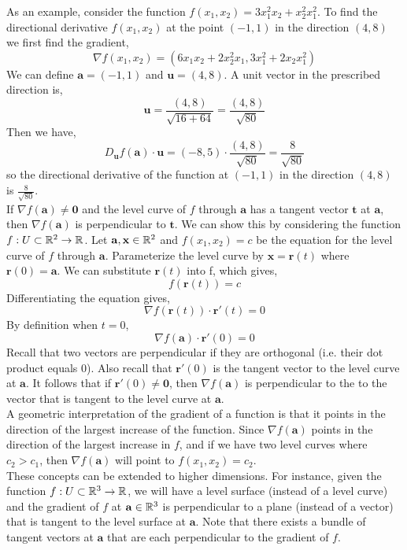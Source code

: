 \documentclass[12pt]{article}
\begin{document}
As an example, consider the function $f(x_1,x_2) = 3x_1^2x_2 + x_2^2x_1^2$. To find the directional derivative $f(x_1,x_2)$ at the point $(-1,1)$ in the direction $(4,8)$ we first find the gradient,
\[
\nabla f(x_1,x_2) =  (6x_1x_2 + 2x_2^2x_1, 3x_1^2+2x_2x_1^2)
\]
We can define $\mathbf{a}=(-1,1)$ and $\mathbf{u}=(4,8)$. A unit vector in the prescribed direction is,
\[
\mathbf{u} = \frac{(4,8)}{\sqrt{16+64}} = \frac{(4,8)}{\sqrt{80}}
\]
Then we have,
\[
D_{\mathbf{u}}f(\mathbf{a}) \cdot \mathbf{u} =  (-8,5) \cdot \frac{(4,8)}{\sqrt{80}} = \frac{8}{\sqrt{80}}
\]
so the directional derivative of the function at $(-1,1)$ in the direction $(4,8)$ is $\frac{8}{\sqrt{80}}$. \\

 If $\nabla f(\mathbf{a})\neq\mathbf{0}$ and the level curve of $f$ through $\mathbf{a}$ has a tangent vector $\mathbf{t}$ at $\mathbf{a}$, then $\nabla f(\mathbf{a})$ is perpendicular to $\mathbf{t}$. We can show this by considering the function $f:U\subset\mathbb{R}^2\rightarrow\mathbb{R}$. Let $\mathbf{a},\mathbf{x}\in\mathbb{R}^2$ and $f(x_1,x_2)=c$ be the equation for the level curve of $f$ through $\mathbf{a}$. Parameterize the level curve by $\mathbf{x}=\mathbf{r}(t)$ where $\mathbf{r}(0)=\mathbf{a}$. We can substitute $\mathbf{r}(t)$ into f, which gives,
\[
f(\mathbf{r}(t)) = c
\]
Differentiating the equation gives,
\[
\nabla f(\mathbf{r}(t))\cdot\mathbf{r}'(t) = 0
\]
By definition when $t=0$,
\[
\nabla f(\mathbf{a})\cdot\mathbf{r}'(0) = 0
\]
Recall that two vectors are perpendicular if they are orthogonal (i.e. their dot product equals 0). Also recall that $\mathbf{r}'(0)$ is the tangent vector to the level curve at $\mathbf{a}$. It follows that if $\mathbf{r}'(0)\neq\mathbf{0}$, then $\nabla f(\mathbf{a})$ is perpendicular to the to the vector that is tangent to the level curve at $\mathbf{a}$. \\

A geometric interpretation of the gradient of a function is that it points in the direction of the largest increase of the function. Since $\nabla f(\mathbf{a})$ points in the direction of the largest increase in $f$, and if we have two level curves where $c_2>c_1$, then $\nabla f(\mathbf{a})$ will point to $f(x_1,x_2) = c_2$. \\

 These concepts can be extended to higher dimensions. For instance, given the function $f:U\subset\mathbb{R}^3\rightarrow\mathbb{R}$, we will have a level surface (instead of a level curve) and the gradient of $f$ at $\mathbf{a}\in\mathbb{R}^3$ is perpendicular to a plane (instead of a vector) that is tangent to the level surface at $\mathbf{a}$. Note that there exists a bundle of tangent vectors at $\mathbf{a}$ that are each perpendicular to the gradient of $f$. \\
\end{document}
